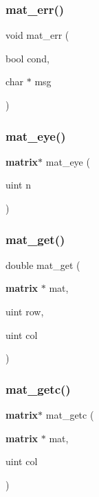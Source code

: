 \mbox{\label{mat_lib_8h_a63727a70ecf74537b3d607c9ab28ee62}} 
\subsubsection{mat\+\_\+err()}
{\footnotesize\ttfamily void mat\+\_\+err (\begin{DoxyParamCaption}\item[{bool}]{cond,  }\item[{char $\ast$}]{msg }\end{DoxyParamCaption})}

\mbox{\label{mat_lib_8h_a4a0377a533c7d86610a005842740e67b}} 
\subsubsection{mat\+\_\+eye()}
{\footnotesize\ttfamily \textbf{ matrix}$\ast$ mat\+\_\+eye (\begin{DoxyParamCaption}\item[{uint}]{n }\end{DoxyParamCaption})}

\mbox{\label{mat_lib_8h_aea983c924839bb705503a398191d2cf3}} 
\subsubsection{mat\+\_\+get()}
{\footnotesize\ttfamily double mat\+\_\+get (\begin{DoxyParamCaption}\item[{\textbf{ matrix} $\ast$}]{mat,  }\item[{uint}]{row,  }\item[{uint}]{col }\end{DoxyParamCaption})}

\mbox{\label{mat_lib_8h_a419833098facc7ae2cebb842f00dc4a5}} 
\subsubsection{mat\+\_\+getc()}
{\footnotesize\ttfamily \textbf{ matrix}$\ast$ mat\+\_\+getc (\begin{DoxyParamCaption}\item[{\textbf{ matrix} $\ast$}]{mat,  }\item[{uint}]{col }\end{DoxyParamCaption})}

